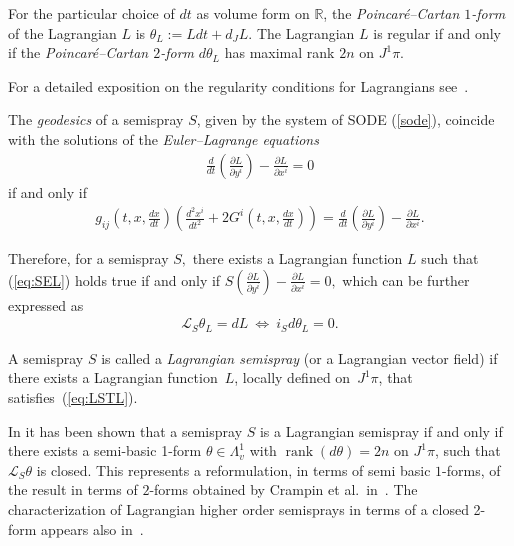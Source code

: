 For the particular choice of $dt$ as volume form on $\mathbb{R}$,
the \emph{Poincar\'e--Cartan $1$-form} of the Lagrangian $L$ is
$\theta_{L}:=Ldt+d_{J}L$. The Lagrangian $L$ is regular if and only
if the \emph{Poincar\'e--Cartan $2$-form} $d\theta_{L}$ has maximal
rank $2n$ on $J^{1}\pi$.

For a detailed exposition on the regularity conditions for Lagrangians
see~\cite{Krupkova}.


The \emph{geodesics} of a semispray $S$, given by the system of SODE
(\ref{sode}), coincide with the solutions of the \emph{Euler--Lagrange
equations} \begin{gather*}
\frac{d}{dt}\left(\frac{\partial L}{\partial y^{i}}\right)-\frac{\partial L}{\partial x^{i}}=0%
\end{gather*}
 if and only if \begin{gather}
g_{ij}\left(t,x,\frac{dx}{dt}\right)\left(\frac{d^{2}x^{i}}{dt^{2}}+2G^{i}\left(t,x,\frac{dx}{dt}\right)\right)=\frac{d}{dt}\left(\frac{\partial L}{\partial y^{i}}\right)-\frac{\partial L}{\partial x^{i}}.\label{eq:SEL}\end{gather}


Therefore, for a semispray $S,$ there exists a Lagrangian function
$L$ such that (\ref{eq:SEL}) holds true if and only if $S\left(\frac{\partial L}{\partial y^{i}}\right)-\frac{\partial L}{\partial x^{i}}=0,$
which can be further expressed as
\begin{gather}
\mathcal{L}_{S}\theta_{L}=dL \ \Leftrightarrow \ i_{S}d\theta_{L}=0.\label{eq:LSTL}
\end{gather}


\begin{definition}
A semispray $S$ is called a \emph{Lagrangian semispray} (or a Lagrangian
vector f\/ield) if there exists a Lagrangian function~$L$,
locally def\/ined on~$J^{1}\pi$, that satisf\/ies~(\ref{eq:LSTL}).
\end{definition}

In \cite{B-C-2010} it has been shown that a semispray $S$ is a Lagrangian
semispray if and only if there exists a semi-basic 1-form $\theta\in\Lambda_{v}^{1}$
with $\operatorname{rank}(d\theta)=2n$ on $J^{1}\pi$, such that
$\mathcal{L}_{S}\theta$ is closed. This represents a reformulation,
in terms of semi basic $1$-forms, of the result in terms of $2$-forms
obtained by Crampin et al.\ in~\cite{crampin84a}. The characterization
of Lagrangian higher order semisprays in terms of a closed 2-form
appears also in~\cite{anderso92}.

